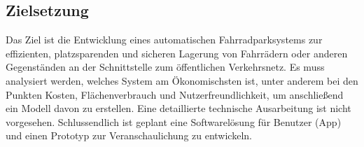 \subsection{Zielsetzung}
Das Ziel ist die Entwicklung eines automatischen Fahrradparksystems zur effizienten, platzsparenden und sicheren Lagerung von Fahrrädern oder anderen Gegenständen an der Schnittstelle zum öffentlichen Verkehrsnetz. Es muss analysiert werden, welches System am Ökonomischsten ist, unter anderem bei den Punkten Kosten, Flächenverbrauch und Nutzerfreundlichkeit, um anschließend ein Modell davon zu erstellen. Eine detaillierte technische Ausarbeitung ist nicht vorgesehen. Schlussendlich ist geplant eine Softwarelösung für Benutzer (App) und einen Prototyp zur Veranschaulichung zu entwickeln.